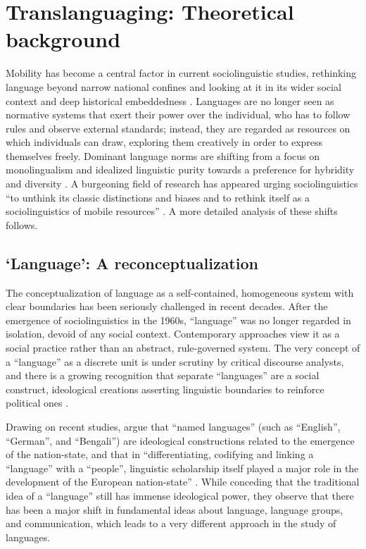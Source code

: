 \documentclass[output=paper]{langscibook}
\begin{document}
\section{Translanguaging: Theoretical background}
Mobility has become a central factor in current sociolinguistic studies, rethinking language beyond narrow national confines and looking at it in its wider social context and deep historical embeddedness \citep{Blommaert.2011}. Languages are no longer seen as normative systems that exert their power over the individual, who has to follow rules and observe external standards; instead, they are regarded as resources on which individuals can draw, exploring them creatively in order to express themselves freely. Dominant language norms are shifting from a focus on monolingualism and idealized linguistic purity towards a preference for hybridity and diversity \citep{Jrgensen.2011}. A burgeoning field of research has appeared urging sociolinguistics “to unthink its classic distinctions and biases and to rethink itself as a sociolinguistics of mobile resources” \citep[1]{Blommaert.2010}. A more detailed analysis of these shifts follows.

\subsection{‘Language’: A reconceptualization}
The conceptualization of language as a self-contained, homogeneous system with clear boundaries has been seriously challenged in recent decades. After the emergence of sociolinguistics in the 1960s, ``language'' was no longer regarded in isolation, devoid of any social context. Contemporary approaches view it as a social practice rather than an abstract, rule-governed system. The very concept of a ``language'' as a discrete unit is under scrutiny by critical discourse analysts, and there is a growing recognition that separate ``languages'' are a social construct, ideological creations asserting linguistic boundaries to reinforce political ones \citep{Blommaert.2011,Saraceni.2015,Jrgensen.2011}.

Drawing on recent studies, \citeauthor{Blommaert.2011} argue that “named languages” (such as ``English'', ``German'', and ``Bengali'') are ideological constructions related to the emergence of the nation-state, and that in “differentiating, codifying and linking a ``language'' with a ``people'', linguistic scholarship itself played a major role in the development of the European nation-state” \citep[4]{Blommaert.2011}. While conceding that the traditional idea of a ``language'' still has immense ideological power, they observe that there has been a major shift in fundamental ideas about language, language groups, and communication, which leads to a very different approach in the study of languages.
\end{document}
